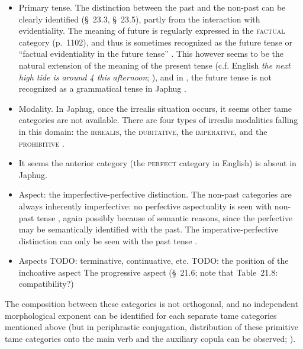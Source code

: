 \documentclass[a4paper, oneside, 12pt]{report}
\newcommand*{\citesec}[1]{\S~{#1}}
\newcommand*{\citetable}[1]{Table~{#1}}
\newcommand*{\citepage}[1]{p.~{#1}}
\newcommand*{\citepages}[1]{pp.~{#1}}
\newcommand{\form}[1]{\emph{#1}}
\newcommand{\category}[1]{\textsc{#1}}
\begin{document}
\begin{itemize}
    \item Primary tense. 
    The distinction between the past and the non-past
    can be clearly identified (\citesec{23.3}, \citesec{23.5}),
    partly from the interaction with evidentiality.
    The meaning of future
    is regularly expressed in the \category{factual} category (\citepage{1102}),
    and thus is sometimes recognized as the future tense 
    or ``factual evidentiality in the future tense'' 
    \citep[\citepage{518}]{jacques2019egophoric}.
    This however seems to be the natural extension of the meaning 
    of the present tense 
    (c.f. English \form{the next high tide is around 4 this afternoon}; 
    \citealt[\citepage{131}, {[20]}]{cgel}),
    and in \citet{jacques2021grammar}, 
    the future tense is not recognized as a grammatical tense in Japhug
    \citep[\citepage{1102}, (46)]{jacques2021grammar}.

    \item Modality. 
        In Japhug, once the irrealis situation occurs, 
        it seems other \acs{tame} categories are not available. 
        There are four types of irrealis modalities falling in this domain:
        the \category{irrealis}, the \category{dubitative}, 
        the \category{imperative}, and the \category{prohibitive}
        \citep[\citesec{21.4}]{jacques2021grammar}.

    \item It seems the anterior category
        (the \category{perfect} category in English)
        is absent in Japhug.

    \item Aspect: the imperfective-perfective distinction.
        The non-past categories are always inherently imperfective:
        no perfective aspectuality is seen with non-past tense 
        \citep[\citepage{517}]{jacques2019egophoric},
        again possibly because of semantic reasons,
        since the perfective may be semantically identified with the past.
        The imperative-perfective distinction can only be seen 
        with the past tense \citep[\citetable{21.1}, note that the \category{aorist} is also known as 
        the \category{past perfective}; \citepages{1135, 1143}]{jacques2021grammar}.
    \item Aspects TODO: terminative, continuative, etc. TODO: the position of the inchoative aspect 
        The progressive aspect (\citesec{21.6}; note that \citetable{21.8}: compatibility?) 
\end{itemize}

The composition between these categories is not orthogonal, 
and no independent morphological exponent can be identified for 
each separate \acs{tame} categories mentioned above
(but in periphrastic conjugation, 
distribution of these primitive \acs{tame} categories 
onto the main verb and the auxiliary copula 
can be observed; \citealt[\citepage{1089}, (7)]{jacques2021grammar}).
\end{document}
